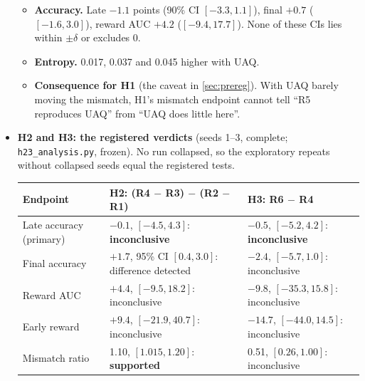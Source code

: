 \documentclass[11pt]{article}
\begin{document}
\begin{itemize}
\begin{itemize}
  \item \textbf{Accuracy.} Late $-1.1$ points (90\% CI $[-3.3, 1.1]$), final $+0.7$ ($[-1.6, 3.0]$), reward AUC $+4.2$ ($[-9.4, 17.7]$). None of these CIs lies within $\pm\delta$ or excludes 0.
  \item \textbf{Entropy.} 0.017, 0.037 and 0.045 higher with UAQ.
  \item \textbf{Consequence for H1} (the caveat in \cref{sec:prereg}). With UAQ barely moving the mismatch, H1's mismatch endpoint cannot tell ``R5 reproduces UAQ'' from ``UAQ does little here''.
  \end{itemize}
\item \textbf{H2 and H3: the registered verdicts} (seeds 1--3, complete; \texttt{h23\_analysis.py}, frozen). No run collapsed, so the exploratory repeats without collapsed seeds equal the registered tests.

\smallskip
{\footnotesize
\begin{tabularx}{\linewidth}{@{}l L L@{}}
\toprule
Endpoint & H2: (R4 $-$ R3) $-$ (R2 $-$ R1) & H3: R6 $-$ R4\\
\midrule
Late accuracy (primary) & $-0.1$, $[-4.5, 4.3]$: \textbf{inconclusive} & $-0.5$, $[-5.2, 4.2]$: \textbf{inconclusive}\\
Final accuracy & $+1.7$, 95\% CI $[0.4, 3.0]$: difference detected & $-2.4$, $[-5.7, 1.0]$: inconclusive\\
Reward AUC & $+4.4$, $[-9.5, 18.2]$: inconclusive & $-9.8$, $[-35.3, 15.8]$: inconclusive\\
Early reward & $+9.4$, $[-21.9, 40.7]$: inconclusive & $-14.7$, $[-44.0, 14.5]$: inconclusive\\
Mismatch ratio & 1.10, $[1.015, 1.20]$: \textbf{supported} & 0.51, $[0.26, 1.00]$: inconclusive\\
\bottomrule
\end{tabularx}

}
\end{itemize}
\end{document}
